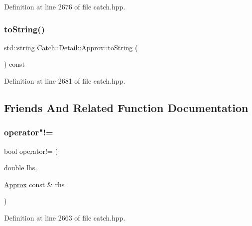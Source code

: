 Definition at line 2676 of file catch.\+hpp.

\hypertarget{class_catch_1_1_detail_1_1_approx_a972fd9ac60607483263f1b0f0f9955e6}{}\label{class_catch_1_1_detail_1_1_approx_a972fd9ac60607483263f1b0f0f9955e6} 
\subsubsection{\texorpdfstring{to\+String()}{toString()}}
{\footnotesize\ttfamily std\+::string Catch\+::\+Detail\+::\+Approx\+::to\+String (\begin{DoxyParamCaption}{ }\end{DoxyParamCaption}) const\hspace{0.3cm}{\ttfamily [inline]}}



Definition at line 2681 of file catch.\+hpp.



\subsection{Friends And Related Function Documentation}
\hypertarget{class_catch_1_1_detail_1_1_approx_a83b3763569a7ecc143c335b630be0e47}{}\label{class_catch_1_1_detail_1_1_approx_a83b3763569a7ecc143c335b630be0e47} 
\subsubsection{\texorpdfstring{operator"!=}{operator!=}\hspace{0.1cm}{\footnotesize\ttfamily [1/2]}}
{\footnotesize\ttfamily bool operator!= (\begin{DoxyParamCaption}\item[{double}]{lhs,  }\item[{\hyperlink{class_catch_1_1_detail_1_1_approx}{Approx} const \&}]{rhs }\end{DoxyParamCaption})\hspace{0.3cm}{\ttfamily [friend]}}



Definition at line 2663 of file catch.\+hpp.

